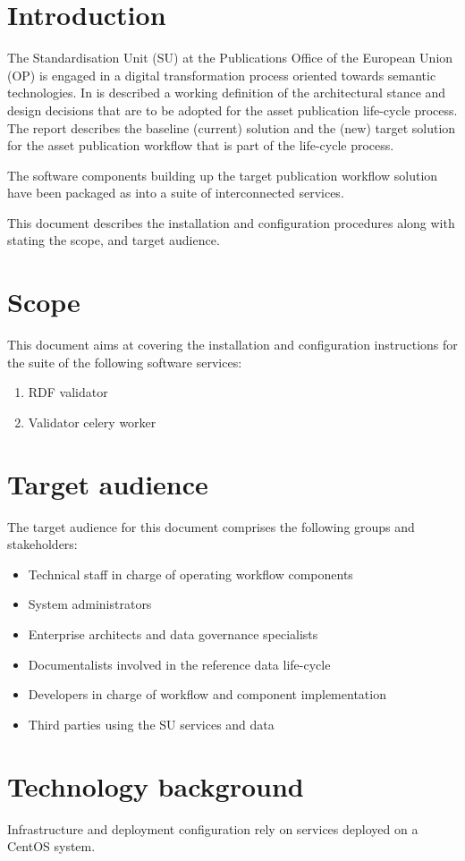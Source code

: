 \section{Introduction}
\label{sec:introduction}

The Standardisation Unit (SU) at the Publications Office of the European Union (OP) is engaged in a digital transformation process oriented towards semantic technologies. In \citep{costetchi2020d} is described a working definition of the architectural stance and design decisions that are to be adopted for the asset publication life-cycle process. The report describes the baseline (current) solution and the (new) target solution for the asset publication workflow that is part of the life-cycle process. 

The software components building up the target publication workflow solution have been packaged as into a suite of interconnected services.

This document describes the installation and configuration procedures along with stating the scope, and target audience.

\section{Scope}
\label{sec:scope}

This document aims at covering the installation and configuration instructions for the suite of the following software services:

\begin{enumerate}
	\item RDF validator
	\item Validator celery worker
\end{enumerate}

\section{Target audience}
\label{sec:audience}

The target audience for this document comprises the following groups and stakeholders:	
\begin{itemize}
	\item Technical staff in charge of operating workflow components
	\item System administrators
	\item Enterprise architects and data governance specialists
	\item Documentalists involved in the reference data life-cycle
	\item Developers in charge of workflow and component implementation
	\item Third parties using the SU services and data
\end{itemize}

\section{Technology background}
\label{sec:background}

Infrastructure and deployment configuration rely on services deployed on a CentOS system.